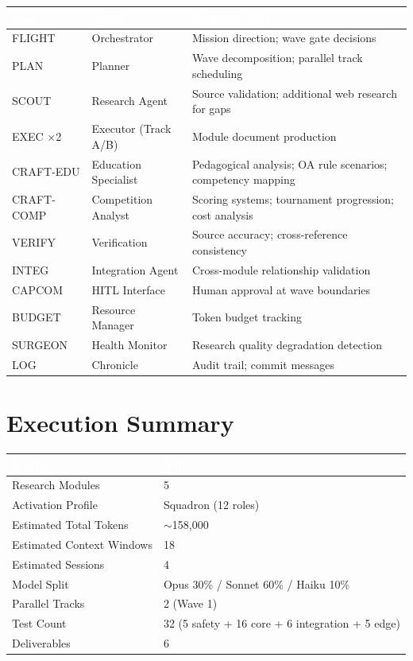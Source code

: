\documentclass[11pt,letterpaper]{article}
\newcommand{\tableheader}[1]{\textbf{\sffamily\textcolor{white}{#1}}}
\begin{document}
\begin{center}
\begin{tabularx}{\textwidth}{L{2cm}L{3cm}X}
\toprule
{}
\tableheader{Role} & \tableheader{Agent} & \tableheader{Responsibility} \\
\midrule
FLIGHT & Orchestrator & Mission direction; wave gate decisions \\
PLAN & Planner & Wave decomposition; parallel track scheduling \\
SCOUT & Research Agent & Source validation; additional web research for gaps \\
EXEC ×2 & Executor (Track A/B) & Module document production \\
CRAFT-EDU & Education Specialist & Pedagogical analysis; OA rule scenarios; competency mapping \\
CRAFT-COMP & Competition Analyst & Scoring systems; tournament progression; cost analysis \\
VERIFY & Verification & Source accuracy; cross-reference consistency \\
INTEG & Integration Agent & Cross-module relationship validation \\
CAPCOM & HITL Interface & Human approval at wave boundaries \\
BUDGET & Resource Manager & Token budget tracking \\
SURGEON & Health Monitor & Research quality degradation detection \\
LOG & Chronicle & Audit trail; commit messages \\
\bottomrule
\end{tabularx}
\end{center}

\section{Execution Summary}

\begin{center}
\begin{tabularx}{\textwidth}{L{5cm}X}
\toprule
{}
\tableheader{Metric} & \tableheader{Value} \\
\midrule
Research Modules & 5 \\
Activation Profile & Squadron (12 roles) \\
Estimated Total Tokens & $\sim$158,000 \\
Estimated Context Windows & 18 \\
Estimated Sessions & 4 \\
Model Split & Opus 30\% / Sonnet 60\% / Haiku 10\% \\
Parallel Tracks & 2 (Wave 1) \\
Test Count & 32 (5 safety + 16 core + 6 integration + 5 edge) \\
Deliverables & 6 \\
\bottomrule
\end{tabularx}
\end{center}
\end{document}
